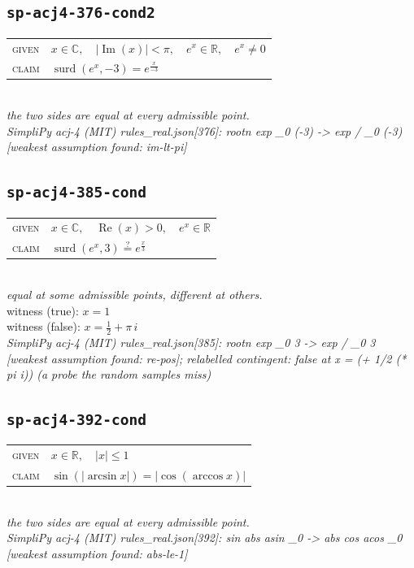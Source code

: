 \documentclass[11pt]{article}
\begin{document}
\subsection*{\texttt{sp-acj4-376-cond2}}
\begin{tabular}{@{}l@{\quad}l@{}}
\textsc{given} & $x \in \mathbb{C},\quad \left|\operatorname{Im}\left(x\right)\right| < \pi,\quad e^{x} \in \mathbb{R},\quad e^{x} \neq 0$ \\[4pt]
\textsc{claim} & $\displaystyle \operatorname{surd}\left(e^{x}, -3\right) = e^{\frac{x}{-3}}$ \\
\end{tabular}\\[2pt]
{\small\emph{the two sides are equal at every admissible point.}}\\
\emph{SimpliPy acj-4 (MIT) rules\_real.json[376]: rootn exp \_0 (-3)  ->  exp / \_0 (-3)  [weakest assumption found: im-lt-pi]}\\

\subsection*{\texttt{sp-acj4-385-cond}}
\begin{tabular}{@{}l@{\quad}l@{}}
\textsc{given} & $x \in \mathbb{C},\quad \operatorname{Re}\left(x\right) > 0,\quad e^{x} \in \mathbb{R}$ \\[4pt]
\textsc{claim} & $\displaystyle \operatorname{surd}\left(e^{x}, 3\right) \overset{?}{=} e^{\frac{x}{3}}$ \\
\end{tabular}\\[2pt]
{\small\emph{equal at some admissible points, different at others.}}\\
{\footnotesize\color{gray}witness (true): $x = 1$}\\
{\footnotesize\color{gray}witness (false): $x = \frac{1}{2} + \pi \, i$}\\
\emph{SimpliPy acj-4 (MIT) rules\_real.json[385]: rootn exp \_0 3  ->  exp / \_0 3  [weakest assumption found: re-pos]; relabelled contingent: false at x = (+ 1/2 (* pi i)) (a probe the random samples miss)}\\

\subsection*{\texttt{sp-acj4-392-cond}}
\begin{tabular}{@{}l@{\quad}l@{}}
\textsc{given} & $x \in \mathbb{R},\quad \left|x\right| \le 1$ \\[4pt]
\textsc{claim} & $\displaystyle \sin\left(\left|\arcsin x\right|\right) = \left|\cos\left(\arccos x\right)\right|$ \\
\end{tabular}\\[2pt]
{\small\emph{the two sides are equal at every admissible point.}}\\
\emph{SimpliPy acj-4 (MIT) rules\_real.json[392]: sin abs asin \_0  ->  abs cos acos \_0  [weakest assumption found: abs-le-1]}\\
\end{document}
